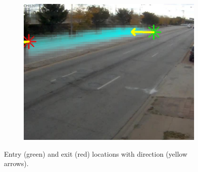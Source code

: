 \begin{figure}
\begin{subfigure}{0.32\linewidth}
            \includegraphics[width=\linewidth]{./img/scene_learning/res/ILCHI_CHI120/ILCHI_CHI120_20151013_095039_099-2.jpg}
        \end{subfigure}
        \caption{Entry (green) and exit (red) locations with direction (yellow arrows).}
        \label{fig:entry-exit-full-1}
\end{figure}
